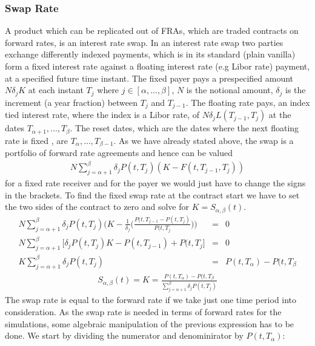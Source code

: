 \documentclass[11pt]{article}
\numberwithin{equation}{subsection}
\begin{document}
\subsubsection{Swap Rate}
A product which can be replicated out of FRAs, which are traded contracts on forward rates, is an interest rate swap. In an interest rate swap two parties exchange differently indexed payments, which is in its standard (plain vanilla) form a fixed interest rate against a floating interest rate (e.g Libor rate) payment, at a specified future time instant. The fixed payer pays a prespecified amount \(N\delta_{j}K\) at each instant \(T_j\) where \(j \in [\alpha,...,\beta]\), \(N\) is the notional amount, \(\delta_j\) is the increment (a year fraction) between \(T_j\) and \(T_{j-1}\). The floating rate pays, an index tied interest rate, where the index is a Libor rate, of \(N\delta_{j}L(T_{j-1}, T_j)\) at the dates \(T_{\alpha+1},...,T_{\beta}\). The reset dates, which are the dates where the next floating rate is fixed , are \(T_{\alpha},...,T_{\beta-1}\). As we have already stated above, the swap is a portfolio of forward rate agreements and hence can be valued
\begin{eqnarray}
N \sum_{j=\alpha+1}^{\beta} \delta_{j} P(t, T_j) (K - F(t, T_{j-1}, T_j))
\end{eqnarray}
for a fixed rate receiver and for the payer we would just have to change the signs in the brackets.
To find the fixed swap rate at the contract start we have to set the two sides of the contract to zero and solve for \(K=S_{\alpha, \beta}(t)\).
\begin{eqnarray}
	N \sum_{j=\alpha+1}^{\beta} \delta_{j} P(t, T_j) \bigg(K - \frac{1}{\delta_j} \bigg(\frac{P(t, T_{j-1}-P(t, T_{j})}{P(t, T_{j}}\bigg) \bigg) &=& 0 \\
	N \sum_{j=\alpha+1}^{\beta} \bigg[\delta_{j} P(t, T_j) K - P(t, T_{j-1}) + P(t, T_{j} \bigg] &=& 0 \\
	K \sum_{j=\alpha+1}^{\beta} \delta_{j} P(t, T_j) &=& P(t, T_{\alpha}) - P(t, T_{\beta}
\end{eqnarray}
\begin{eqnarray}
S_{\alpha, \beta}(t) = K = \frac{P(t, T_{\alpha}) - P(t, T_{\beta}}{\sum_{j=\alpha+1}^{\beta} \delta_{j} P(t, T_j)}
\end{eqnarray}
The swap rate is equal to the forward rate if we take just one time period into consideration. As the swap rate is needed in terms of forward rates for the simulations, some algebraic manipulation of the previous expression has to be done. We start by dividing the numerator and denominirator by \(P(t, T_{\alpha})\):
\end{document}
